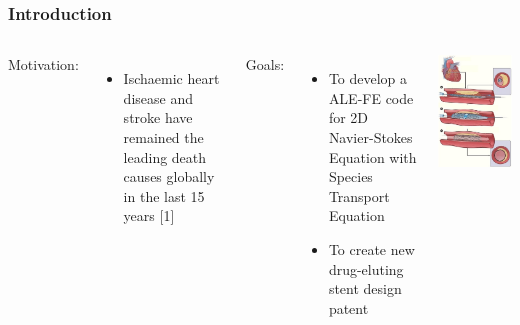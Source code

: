 \begin{frame}
\frametitle{Introduction}
\vspace{-0.9cm}
\begin{columns}[c]
Motivation:
\begin{itemize}
  \justifying
  \item Ischaemic heart disease and stroke have remained the leading death causes globally in the last 15 years [1]
\end{itemize}
 
\vspace{0.3cm}
 
Goals:
\begin{itemize}
 \justifying
 \item To develop a ALE-FE code for 2D Navier-Stokes Equation with Species Transport Equation


 \vspace{0.2cm}
 \item To create new drug-eluting stent design patent 

\end{itemize}
\begin{center}
  \includegraphics[scale=0.38]{images/stent_bare.jpg}
\end{center}
\end{columns}


\end{frame}
